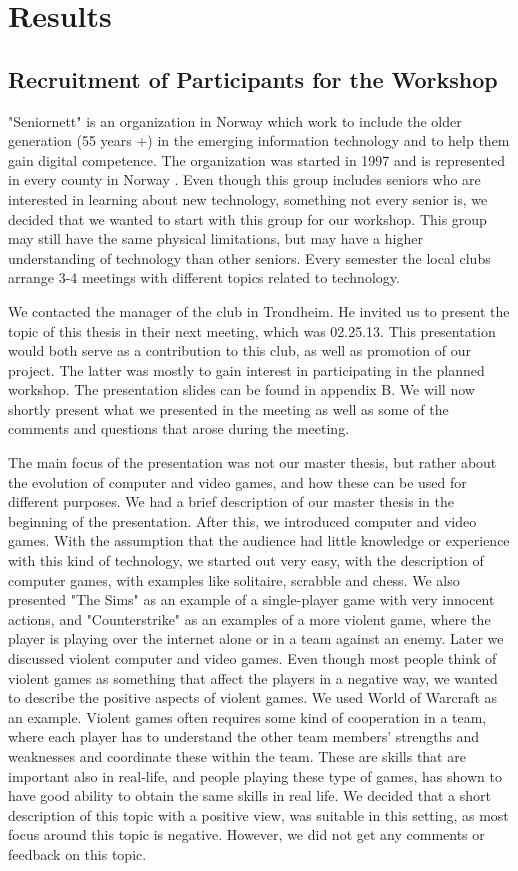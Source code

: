 \chapter{Results}
\section{Recruitment of Participants for the Workshop}
"Seniornett" is an organization in Norway which work to include the older generation (55 years +) in the emerging information technology and to help them gain digital competence. The organization was started in 1997 and is represented in every county in Norway \cite{seniornett}. Even though this group includes seniors who are interested in learning about new technology, something not every senior is, we decided that we wanted to start with this group for our workshop. This group may still have the same physical limitations, but may have a higher understanding of technology than other seniors. Every semester the local clubs arrange 3-4 meetings with different topics related to technology.

We contacted the manager of the club in Trondheim. He invited us to present the topic of this thesis in their next meeting, which was 02.25.13. This presentation would both serve as a contribution to this club, as well as promotion of our project. The latter was mostly to gain interest in participating in the planned workshop. The presentation slides can be found in appendix B. We will now shortly present what we presented in the meeting as well as some of the comments and questions that arose during the meeting. 

The main focus of the presentation was not our master thesis, but rather about the evolution of computer and video games, and how these can be used for different purposes. We had a brief description of our master thesis in the beginning of the presentation. After this, we introduced computer and video games. With the assumption that the audience had little knowledge or experience with this kind of technology, we started out very easy, with the description of computer games, with examples like solitaire, scrabble and chess. We also presented "The Sims" as an example of a single-player game with very innocent actions, and "Counterstrike" as an examples of a more violent game, where the player is playing over the internet alone or in a team against an enemy. Later we discussed violent computer and video games. Even though most people think of violent games as something that affect the players in a negative way, we wanted to describe the positive aspects of violent games. We used World of Warcraft as an example. Violent games often requires some kind of cooperation in a team, where each player has to understand the other team members' strengths and weaknesses and coordinate these within the team. These are skills that are important also in real-life, and people playing these type of games, has shown to have good ability to obtain the same skills in real life. We decided that a short description of this topic with a positive view, was suitable in this setting, as most focus around this topic is negative. However, we did not get any comments or feedback on this topic. 


